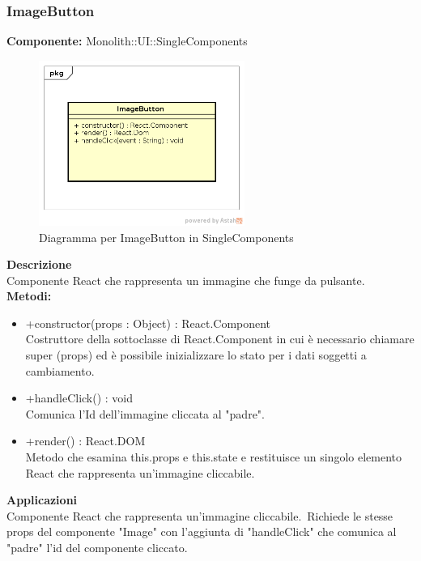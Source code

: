 \clearpage

\subsubsection{ImageButton}
\textbf{Componente:}  Monolith::UI::SingleComponents\\
   \FloatBarrier
   \begin{figure}[ht]
   \centering
   \includegraphics[width=0.6\textwidth]{img/single-ImageButton}
   \caption{{Diagramma per ImageButton in SingleComponents}}
\end{figure}
\FloatBarrier
\textbf{Descrizione}\\
Componente React che rappresenta un immagine che funge da pulsante. \\
\textbf{Metodi:} 
\begin{itemize}
\item +constructor(props : Object) : React.Component 
\\
Costruttore della sottoclasse di React.Component in cui è necessario chiamare super (props) ed è possibile inizializzare lo stato per i dati soggetti a cambiamento.
\item +handleClick() : void 
\\
Comunica l'Id dell'immagine cliccata al "padre". 
\item +render() : React.DOM 
\\
Metodo che esamina this.props e this.state e restituisce un singolo elemento React che rappresenta un'immagine cliccabile.
\end{itemize} 


\textbf{Applicazioni}\\
Componente React che rappresenta un'immagine cliccabile.\ Richiede le stesse props del componente "Image" con l'aggiunta di "handleClick" che comunica al "padre" l'id del componente cliccato. 


\clearpage

